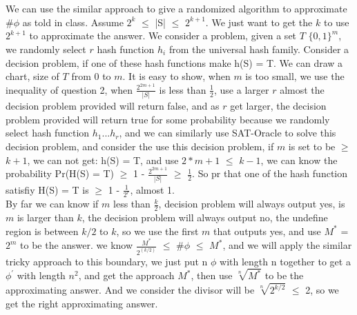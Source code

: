 \documentclass[11pt]{article}
\begin{document}
\part{}
We can use the similar approach to give a randomized algorithm to approximate \#$\phi$ as told in class. Assume $2^{k}$ $\leq$ |S| $\leq$ $2^{k+1}$. We just want to get the $k$ to use $2^{k+1}$ to approximate the answer. We consider a problem, given a set $T$ $\{0,1\}^{m}$, we randomly select $r$ hash function $h_{i}$ from the universal hash family. Consider a decision problem, if one of these hash functions make h(S) = T. We can draw a chart, size of $T$ from 0 to $m$. It is easy to show, when $m$ is too small, we use the inequality of question 2, when 
$\frac{2^{2m+1}}{|S|}$ is less than $\frac{1}{2}$, use a larger $r$ almost the decision problem provided will return false, and as $r$ get larger, the decision problem provided will return true for some probability because we randomly select hash function $h_{1}...h_{r}$, and we can similarly use SAT-Oracle to solve this decision problem, and consider the use this decision problem, if $m$ is set to be $\geq$ $k+1$, we can not get:  h(S) = T, and use $2*m+1$ $\leq$ $k-1$, we can know the probability Pr(H(S) = T) $\geq$ 1 - $\frac{2^{2m+1}}{|S|}$ $\geq$ $\frac{1}{2}$. So pr that one of the hash function satisfiy H(S) = T is $\geq$ 1 - $\frac{1}{2^{r}}$, almost 1. \\
By far we can know if $m$ less than $\frac{k}{2}$, decision problem will always output yes, is $m$ is larger than $k$, the decision problem will always output no, the undefine region is between $k/2$ to $k$, so we use the first $m$ that outputs yes, and use $M^{*}$ = $2^{m}$ to be the answer. we know $\frac{M^{*}}{2^(k/2)}$ $\leq$ \#$\phi$ $\leq$ $M^{*}$, and we will apply the similar tricky approach to this boundary, we just put n $\phi$ with length n together to get a $\phi^{'}$ with length $n^{2}$, and get the approach $M^{*}$, then use $\sqrt[n]{M^{*}}$ to be the approximating answer. And we consider the divisor will be $\sqrt[n]{2^{k/2}}$ $\leq$ 2, so we get the right approximating answer.
\end{document}

